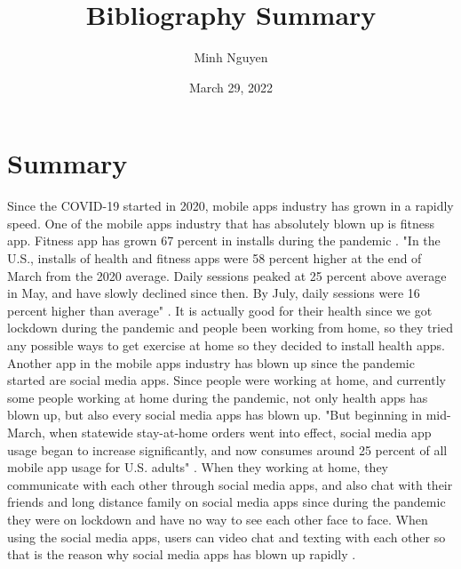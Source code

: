 \documentclass{article}
\title{Bibliography Summary}
\author{Minh Nguyen}
\date{March 29, 2022}
\begin{document}
\maketitle

\section*{Summary}
Since the COVID-19 started in 2020, mobile apps industry has grown in a rapidly speed. One of the mobile apps industry that has absolutely blown up is fitness app. Fitness app has grown 67 percent in installs during the pandemic \cite{Robert20}. "In the U.S., installs of health and fitness apps were 58 percent higher at the end of March from the 2020 average. Daily sessions peaked at 25 percent above average in May, and have slowly declined since then. By July, daily sessions were 16 percent higher than average" \cite{Robert20}. It is actually good for their health since we got lockdown during the pandemic and people been working from home, so they tried any possible ways to get exercise at home so they decided to install health apps. Another app in the mobile apps industry has blown up since the pandemic started are social media apps. Since people were working at home, and currently some people working at home during the pandemic, not only health apps has blown up, but also every social media apps has blown up. "But beginning in mid-March, when statewide stay-at-home orders went into effect, social media app usage began to increase significantly, and now consumes around 25 percent of all mobile app usage for U.S. adults" \cite{Sara20}. When they working at home, they communicate with each other through social media apps, and also chat with their friends and long distance family on social media apps since during the pandemic they were on lockdown and have no way to see each other face to face. When using the social media apps, users can video chat and texting with each other so that is the reason why social media apps has blown up rapidly \cite{Sara20}.




\printbibliography
\end{document}
